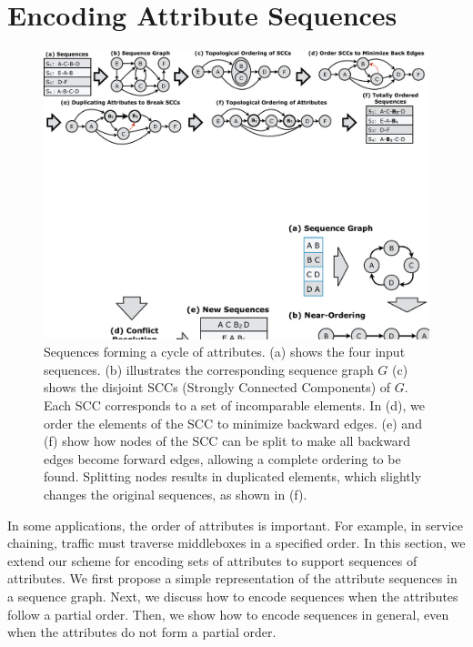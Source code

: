\section{Encoding Attribute Sequences}
\label{sec:ordering}


\begin{figure}[t!]
\includegraphics[trim={0 18cm 0 0}, clip, width=\textwidth]{figures/partial_ordering2}
\caption{Sequences forming a cycle of attributes. (a) shows the four input sequences. (b) illustrates the corresponding sequence graph $G$ (c) shows the disjoint SCCs (Strongly Connected Components) of $G$. Each SCC corresponds to a set of incomparable elements. In (d), we order the elements of the SCC to minimize backward edges. (e) and (f) show how nodes of the SCC can be split to make all backward edges become forward edges, allowing a complete ordering to be found. Splitting nodes results in duplicated elements, which slightly changes the original sequences, as shown in (f).}
\label{fig:ordering}
\end{figure}

In some applications, the {order} of attributes is important.  For
example, in service chaining, traffic must traverse middleboxes in a
specified order.  In this section, we extend our scheme for encoding
{sets} of attributes to support {sequences} of attributes.  We first
propose a simple representation of the attribute sequences in a sequence
graph.  Next, we discuss how to encode sequences when the attributes
follow a partial order.  Then, we show how to encode sequences in
general, even when the attributes do not form a partial order. 

